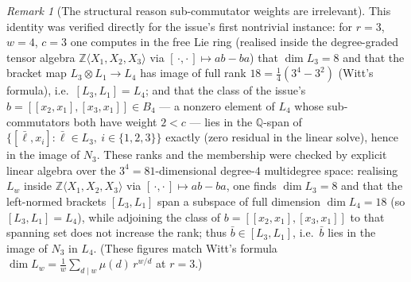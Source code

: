 \documentclass{amsart}
\theoremstyle{definition}
\theoremstyle{remark}
\newtheorem{remark}{Remark}
\begin{document}
\begin{remark}[The structural reason sub-commutator weights are irrelevant]
This identity was verified directly for the issue's first nontrivial instance: for
$r=3$, $w=4$, $c=3$ one computes in the free Lie ring (realised inside the degree-graded
tensor algebra $\mathbb Z\langle X_1,X_2,X_3\rangle$ via $[\,\cdot,\cdot\,]\mapsto
ab-ba$) that $\dim L_3=8$ and that the bracket map
$L_3\otimes L_1\to L_4$ has image of full rank $18=\tfrac14(3^4-3^2)$ (Witt's formula),
i.e.\ $[L_3,L_1]=L_4$; and that the class of the issue's
$b=[[x_2,x_1],[x_3,x_1]]\in B_4$ --- a nonzero element of $L_4$ whose sub-commutators
both have weight $2<c$ --- lies in the $\mathbb Q$-span of
$\{[\bar\ell,x_i]:\bar\ell\in L_3,\ i\in\{1,2,3\}\}$ exactly (zero residual in the
linear solve), hence in the image of $N_3$. These ranks and the membership were checked
by explicit linear algebra over the $3^4=81$-dimensional degree-$4$ multidegree space:
realising $L_w$ inside $\mathbb Z\langle X_1,X_2,X_3\rangle$ via $[\,\cdot,\cdot\,]\mapsto
ab-ba$, one finds $\dim L_3=8$ and that the left-normed brackets $[L_3,L_1]$ span a
subspace of full dimension $\dim L_4=18$ (so $[L_3,L_1]=L_4$), while adjoining the class
of $b=[[x_2,x_1],[x_3,x_1]]$ to that spanning set does not increase the rank; thus $\bar
b\in[L_3,L_1]$, i.e.\ $\bar b$ lies in the image of $N_3$ in $L_4$. (These figures match
Witt's formula $\dim L_w=\tfrac1w\sum_{d\mid w}\mu(d)\,r^{w/d}$ at $r=3$.)
\end{remark}
\end{document}

